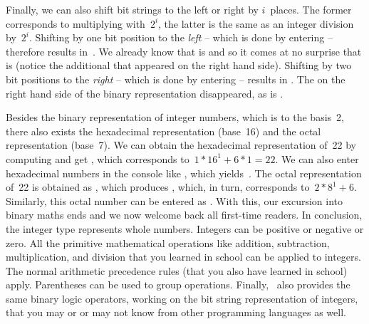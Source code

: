 Finally, we can also shift bit strings to the left or right by $i$~places.
The former corresponds to multiplying with~$2^i$, the latter is the same as an integer division by~$2^i$.
Shifting  by one bit position to the \emph{left} -- which is done by entering \pythonIdx{<<} -- therefore results in~.
We already know that  is  and so it comes at no surprise that  is  (notice the additional  that appeared on the right hand side).
Shifting  by two bit positions to the \emph{right} -- which is done by entering \pythonIdx{>>} -- results in .
The  on the right hand side of the binary representation disappeared, as  is .

Besides the binary representation of integer numbers, which is to the basis~2, there also exists the hexadecimal representation (base~16) and the octal representation (base~7).
We can obtain the hexadecimal representation of~22 by computing  and get , which corresponds to~$1*16^1+6*1=22$.
We can also enter hexadecimal numbers in the console like , which yields~.
The octal representation of~22 is obtained as , which produces , which, in turn, corresponds to~$2*8^1+6$.
Similarly, this octal number can be entered as .
With this, our excursion into binary maths ends and we now welcome back all first-time readers.%
%
\endhsection%
%
%
In conclusion, the integer type  represents whole numbers.
Integers can be positive or negative or zero.
All the primitive mathematical operations like addition, subtraction, multiplication, and division that you learned in school can be applied to integers.
The normal arithmetic precedence rules (that you also have learned in school) apply.
Parentheses can be used to group operations.
Finally, \python\ also provides the same binary logic operators, working on the bit string representation of integers, that you may or or may not know from other programming languages as well.
\endhsection%
\endhsection%
%
